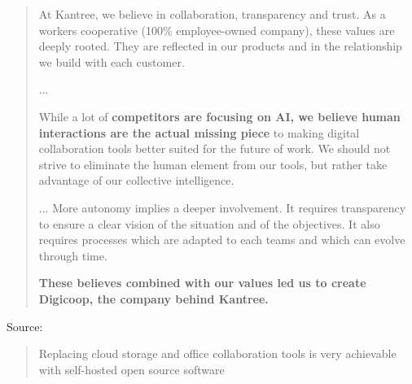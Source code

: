 \documentclass[Screen16to9,17pt]{foils}
\begin{document}
\begin{quote}
At Kantree, we believe in collaboration, transparency and trust.
As a workers cooperative (100\% employee-owned company), these values are deeply rooted.
They are reflected in our products and in the relationship we build with each customer.

...

While a lot of {\bf competitors are focusing on AI, we believe human interactions are the actual missing piece} to making digital collaboration tools better suited for the future of work. We should not strive to eliminate the human element from our tools, but rather take advantage of our collective intelligence.

...
More autonomy implies a deeper involvement. It requires transparency to ensure a clear vision of the situation and of the objectives. It also requires processes which are adapted to each teams and which can evolve through time.

{\bf These believes combined with our values led us to create Digicoop, the company behind Kantree.}


\end{quote}

Source:  




\begin{quote}
Replacing cloud storage and office collaboration tools is very achievable
with self-hosted open source software
\end{quote}
\end{document}
